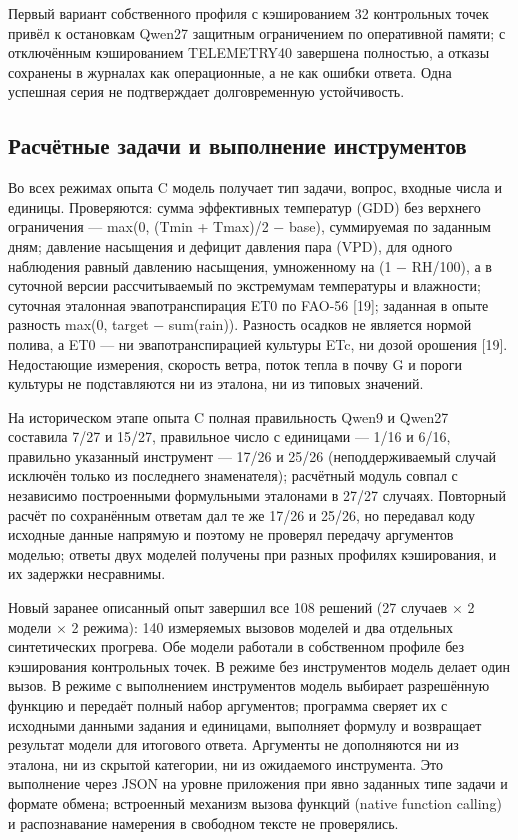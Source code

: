 \documentclass[14pt,a4paper]{extarticle}
\begin{document}
Первый вариант собственного профиля с кэшированием 32 контрольных точек привёл к остановкам Qwen27 защитным ограничением по оперативной памяти; с отключённым кэшированием TELEMETRY40 завершена полностью, а отказы сохранены в журналах как операционные, а не как ошибки ответа. Одна успешная серия не подтверждает долговременную устойчивость.

\subsection*{Расчётные задачи и выполнение инструментов}
Во всех режимах опыта C модель получает тип задачи, вопрос, входные числа и единицы. Проверяются: сумма эффективных температур (GDD) без верхнего ограничения — max(0, (Tmin + Tmax)/2 − base), суммируемая по заданным дням; давление насыщения и дефицит давления пара (VPD), для одного наблюдения равный давлению насыщения, умноженному на (1 − RH/100), а в суточной версии рассчитываемый по экстремумам температуры и влажности; суточная эталонная эвапотранспирация ET0 по FAO-56 [19]; заданная в опыте разность max(0, target − sum(rain)). Разность осадков не является нормой полива, а ET0 — ни эвапотранспирацией культуры ETc, ни дозой орошения [19]. Недостающие измерения, скорость ветра, поток тепла в почву G и пороги культуры не подставляются ни из эталона, ни из типовых значений.

На историческом этапе опыта C полная правильность Qwen9 и Qwen27 составила 7/27 и 15/27, правильное число с единицами — 1/16 и 6/16, правильно указанный инструмент — 17/26 и 25/26 (неподдерживаемый случай исключён только из последнего знаменателя); расчётный модуль совпал с независимо построенными формульными эталонами в 27/27 случаях. Повторный расчёт по сохранённым ответам дал те же 17/26 и 25/26, но передавал коду исходные данные напрямую и поэтому не проверял передачу аргументов моделью; ответы двух моделей получены при разных профилях кэширования, и их задержки несравнимы.

Новый заранее описанный опыт завершил все 108 решений (27 случаев × 2 модели × 2 режима): 140 измеряемых вызовов моделей и два отдельных синтетических прогрева. Обе модели работали в собственном профиле без кэширования контрольных точек. В режиме без инструментов модель делает один вызов. В режиме с выполнением инструментов модель выбирает разрешённую функцию и передаёт полный набор аргументов; программа сверяет их с исходными данными задания и единицами, выполняет формулу и возвращает результат модели для итогового ответа. Аргументы не дополняются ни из эталона, ни из скрытой категории, ни из ожидаемого инструмента. Это выполнение через JSON на уровне приложения при явно заданных типе задачи и формате обмена; встроенный механизм вызова функций (native function calling) и распознавание намерения в свободном тексте не проверялись.
\end{document}
